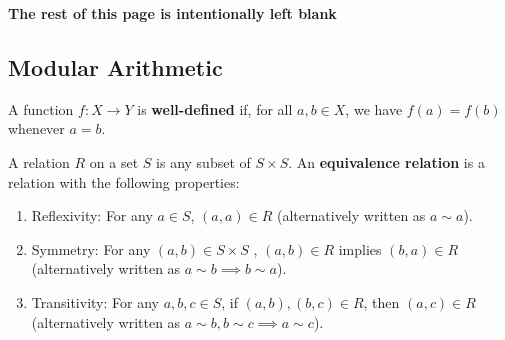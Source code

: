 \documentclass [12pt] {article}
\newenvironment{definition}[1]{\begin{tcolorbox}[title={Definition: #1},colback=blue!5!white,colframe=black!75!blue]}{\end{tcolorbox}}
\renewcommand{\bf}[1]{\textbf{{#1}}}
\begin{document}
\begin{center}
    \vspace{5em}
    \bf{The rest of this page is intentionally left blank}
\end{center}

\newpage
\subsection{Modular Arithmetic}
\begin{definition}{Well-Defined Functions}
    A function $f : X \to Y$ is \bf{well-defined} if, for all $a, b \in X$, we have $f(a) = f(b)$
    whenever $a = b$.
\end{definition}

\begin{definition}{Equivalence Relation}
    A relation $R$ on a set $S$ is any subset of $S \times S$.
    An \bf{equivalence relation} is a relation with the following properties:
    \begin{enumerate}
        \item Reflexivity: For any $a \in S$, $(a, a) \in R$ (alternatively written as $a \sim a$).
        \item Symmetry: For any $(a, b) \in S \times S$ , $(a, b) \in R$ implies $(b, a) \in R$
            (alternatively written as $a \sim b \implies b \sim a$).
        \item Transitivity: For any $a, b, c \in S$, if $(a, b), (b, c) \in R$, then $(a, c) \in R$ 
            (alternatively written as $a \sim b, b \sim c \implies a \sim c$).
    \end{enumerate}
\end{definition}
\end{document}
